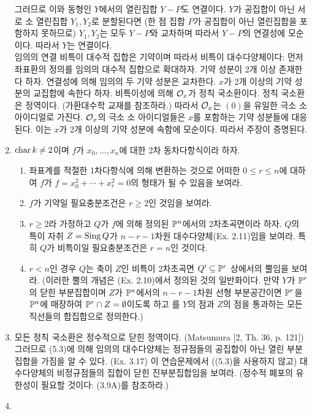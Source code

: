 \begin{enumerate}[label=\tb{5.\arabic*.},itemindent=0mm,itemsep=4mm]
	그러므로 이와 동형인 $Y$에서의 열린집합 $Y-P$도 연결이다. $Y$가 공집합이 아닌 서로 소 열린집합 $Y_1,Y_2$로 분할된다면
	(한 점 집합 $P$가 공집합이 아닌 열린집합을 포함하지 못하므로) $Y_1,Y_2$는 모두 $Y-P$와 교차하며 따라서 $Y-P$의 연결성에 모순이다.
	따라서 $Y$는 연결이다.\\
	임의의 연결 비특이 대수적 집합은 기약이며 따라서 비특이 대수다양체이다: 먼저 좌표환의 정의를 임의의 대수적 집합으로 확대하자.
	기약 성분이 2개 이상 존재한다 하자. 연결성에 의해 임의의 두 기약 성분은 교차한다. $x$가 2개 이상의 기약 성분의 교집합에 속한다 하자.
	비특이성에 의해 $\mathcal{O}_x$가 정칙 국소환이다. 정칙 국소환은 정역이다. (가환대수학 교재를 참조하라.)
	따라서 $\mathcal{O}_x$는 $(0)$을 유일한 극소 소 아이디얼로 가진다.
	$\mathcal{O}_x$의 극소 소 아이디얼들은 $x$를 포함하는 기약 성분들에 대응된다.
	이는 $x$가 2개 이상의 기약 성분에 속함에 모순이다. 따라서 주장이 증명된다.
	\item {} $\operatorname{char} k\ne 2$이며 $f$가 $x_0,\ldots,x_n$에 대한 2차 동차다항식이라 하자.
	\begin{enumerate}[label=(\alph*)]
	\item 좌표계를 적절한 1차다항식에 의해 변환하는 것으로 어떠한 $0\le r\le n$에 대하여
	$f$가 $f=x_0^2+\cdots+x_r^2=0$의 형태가 될 수 있음을 보여라.
	\item $f$가 기약일 필요충분조건은 $r\ge 2$인 것임을 보여라.
	\item $r\ge 2$라 가정하고 $Q$가 $f$에 의해 정의된 $\mathbb{P}^n$에서의 2차초곡면이라 하자.
	$Q$의 특이 자취 $Z=\operatorname{Sing} Q$가 $n-r-1$차원  대수다양체(Ex. 2.11)임을 보여라.
	특히 $Q$가 비특이일 필요충분조건은 $r=n$인 것이다.
	\item $r<n$인 경우 $Q$는 축이 $Z$인 비특이 2차초곡면 $Q'\subseteq\mathbb{P}^r$ 상에서의 뿔임을 보여라.
	(이러한 뿔의 개념은 (Ex. 2.10)에서 정의된 것의 일반화이다. 만약 $Y$가 $\mathbb{P}^r$의 닫힌 부분집합이며
	$Z$가 $\mathbb{P}^n$에서의 $n-r-1$차원 선형 부분공간이면 $\mathbb{P}^r$을 $\mathbb{P}^n$에 매장하여 $\mathbb{P}^r\cap Z=\emptyset$이도록 하고
	를 $Y$의 점과 $Z$의 점을 통과하는 모든 직선들의 합집합으로 정의한다.)
	\end{enumerate}
	\item 모든 정칙 국소환은 정수적으로 닫힌 정역이다. (Matsumura [2, Th. 36, p. 121])
	그러므로 (5.3)에 의해 임의의 대수다양체는 정규점들의 공집합이 아닌 열린 부분집합을 가짐을 알 수 있다. (Ex. 3.17)
	이 연습문제에서 ((5.3)을 사용하지 않고) 대수다양체의 비정규점들의 집합이 닫힌 진부분집합임을 보여라.
	(정수적 폐포의 유한성이 필요할 것이다: (3.9A)를 참조하라.)
	\item {}

\end{enumerate}
